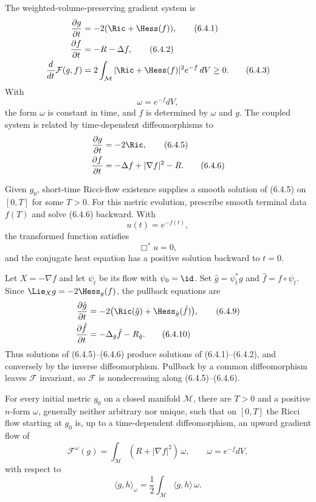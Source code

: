 The weighted-volume-preserving gradient system is
\begin{align}
\frac{\partial g}{\partial t}&=-2(\Ric+\Hess(f)), \tag{6.4.1}\\
\frac{\partial f}{\partial t}&=-R-\Delta f, \tag{6.4.2}\\
\frac{d}{dt}\mathcal F(g,f)&=2\int_{\mathcal M}|\Ric+\Hess(f)|^2e^{-f}\,dV\geq0. \tag{6.4.3}
\end{align}
With
\begin{equation}
\omega=e^{-f}dV, \tag{6.4.4}
\end{equation}
the form $\omega$ is constant in time, and $f$ is determined by $\omega$ and
$g$. The coupled system is related by time-dependent diffeomorphisms to
\begin{align}
\frac{\partial g}{\partial t}&=-2\Ric, \tag{6.4.5}\\
\frac{\partial f}{\partial t}&=-\Delta f+|\nabla f|^2-R. \tag{6.4.6}
\end{align}

Given $g_0$, short-time Ricci-flow existence supplies a smooth solution of
(6.4.5) on $[0,T]$ for some $T>0$. For this metric evolution, prescribe
smooth terminal data $f(T)$ and solve (6.4.6) backward. With
\begin{equation}
u(t)=e^{-f(t)}, \tag{6.4.7}
\end{equation}
the transformed function satisfies
\begin{equation}
\Box^*u=0, \tag{6.4.8}
\end{equation}
and the conjugate heat equation has a positive solution backward to $t=0$.

Let $X=-\nabla f$ and let $\psi_t$ be its flow with $\psi_0=\id$.
Set $\hat g=\psi_t^*g$ and $\hat f=f\circ\psi_t$. Since
$\Lie_Xg=-2\Hess_g(f)$, the pullback equations are
\begin{align}
\frac{\partial\hat g}{\partial t}
&=-2\bigl(\Ric(\hat g)+\Hess_{\hat g}(\hat f)\bigr), \tag{6.4.9}\\
\frac{\partial\hat f}{\partial t}
&=-\Delta_{\hat g}\hat f-R_{\hat g}. \tag{6.4.10}
\end{align}
Thus solutions of (6.4.5)--(6.4.6) produce solutions of (6.4.1)--(6.4.2),
and conversely by the inverse diffeomorphism. Pullback by a common
diffeomorphism leaves $\mathcal F$ invariant, so $\mathcal F$ is
nondecreasing along (6.4.5)--(6.4.6).

\begin{theorem}
\label{topping-gradient-flow-gradient-flow-formulation}
For every initial metric $g_0$ on a closed manifold $\mathcal M$, there are
$T>0$ and a positive $n$-form $\omega$, generally neither arbitrary nor
unique, such that on $[0,T]$ the Ricci flow starting at $g_0$ is, up to a
time-dependent diffeomorphism, an upward gradient flow of
\[
\mathcal F^\omega(g)=\int_{\mathcal M}(R+|\nabla f|^2)\,\omega,
\qquad \omega=e^{-f}dV,
\]
with respect to
\[
\langle g,h\rangle_\omega=\frac12\int_{\mathcal M}\langle g,h\rangle\,\omega.
\]
\end{theorem}

